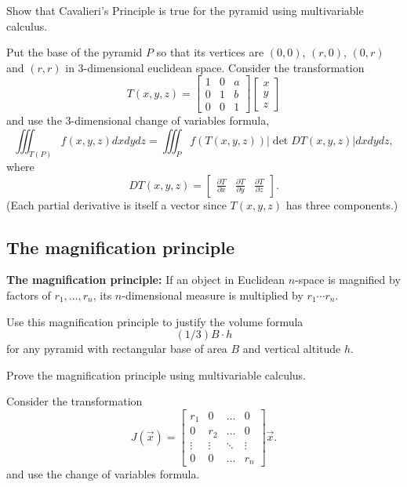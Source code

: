 \documentclass[newpage,hints,handout,noauthor,nooutcomes,12pt]{ximera}
\begin{document}
\begin{problem}
Show that Cavalieri's Principle is true for the pyramid using
multivariable calculus.

\begin{hint}
Put the base of the pyramid $P$ so that its vertices are $\left(
0,0\right) $, $\left( r,0\right) $, $\left( 0,r\right) $ and $\left(
r,r\right) $ in $3$-dimensional euclidean space. Consider the
transformation%
\[
T(x,y,z)=
\begin{bmatrix}
1 & 0 & a\\
0 & 1 & b\\
0 & 0 & 1
\end{bmatrix}
\begin{bmatrix} x \\ y \\ z\end{bmatrix}
\]
and use the 3-dimensional change of variables formula,
$$\iiint_{T(P)} f(x,y,z)dxdydz=\iiint_P f(T(x,y,z))\lvert\det DT(x,y,z)\rvert dxdydz,$$
where
$$DT(x,y,z)=\begin{bmatrix}
\frac{\partial T}{\partial x} & \frac{\partial T}{\partial y} & \frac{\partial T}{\partial z}
\end{bmatrix}.$$
(Each partial derivative is itself a vector since $T(x,y,z)$ has three
components.)
\end{hint}



\end{problem}

\subsection{The magnification principle}

\textbf{The magnification principle:} If an object in Euclidean $n$-space is
magnified by factors of $r_{1},\ldots,r_{n}$, its $n$-dimensional
measure is multiplied by $r_{1}\cdots r_{n}$.

\begin{problem}
Use this magnification principle to justify the volume formula%
\[
(1/3)B\cdot h
\]
for any pyramid with rectangular base of area $B$ and vertical altitude $h$.
\end{problem}

\begin{problem}
Prove the magnification principle using multivariable calculus.

\begin{hint}
Consider the transformation%
\[
J(\vec x)=
\begin{bmatrix}
r_{1} & 0   & \dots & 0\\
0     & r_2 & \dots & 0\\
\vdots &\vdots &\ddots & \vdots \\
0     & 0   & \dots & r_{n}%
\end{bmatrix}\vec x.
\]
and use the change of variables formula.
\end{hint}
\end{problem}
\end{document}
